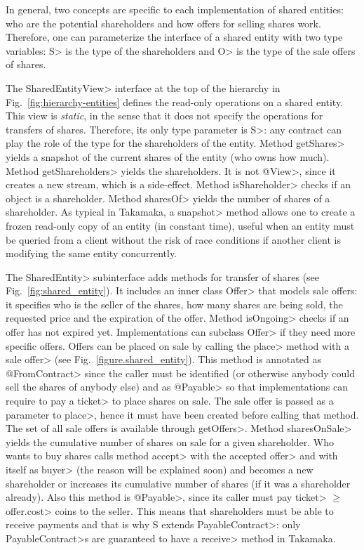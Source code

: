 In general, two concepts are specific to each implementation of shared entities:
who are the potential shareholders and how offers for selling shares work.
Therefore, one can parameterize the interface of a shared entity with two type variables:
\<S> is the type of the shareholders and \<O> is the type of the sale offers of shares.

The \<SharedEntityView> interface at the top of the hierarchy in Fig.~\ref{fig:hierarchy-entities}
defines the read-only operations on a shared entity. This view is \emph{static}, in the sense that it
does not specify the operations for transfers of shares. Therefore, its only type parameter is \<S>:
any contract can play the role of the type for the shareholders of the entity.
Method \<getShares> yields a snapshot of the
current shares of the entity (who owns how much). Method \<getShareholders> yields the shareholders.
It is not \<@View>, since it creates a new stream, which is a side-effect.
Method \<isShareholder> checks if an object is a shareholder. Method \<sharesOf> yields
the number of shares of a shareholder. As typical in Takamaka, a \<snapshot> method allows one
to create a frozen read-only copy of an entity (in constant time), useful when an entity must be queried from
a client without the risk of race conditions if another client is modifying the same entity concurrently.

The \<SharedEntity> subinterface adds methods for transfer of shares
(see Fig.~\ref{fig:shared_entity}).
It includes an inner class \<Offer> that models sale offers:
it specifies who is the seller of the shares,
how many shares are being sold, the requested price and the expiration of the offer.
Method \<isOngoing> checks if an offer has not expired yet.
Implementations can subclass \<Offer> if they need more specific offers.
Offers can be placed on sale
by calling the \<place> method with a sale \<offer>
(see Fig.~\ref{figure.shared_entity}).
This method is annotated as \<@FromContract> since the caller must be
identified (or otherwise anybody could sell the shares of anybody else) and
as \<@Payable> so that implementations can require
to pay a \<ticket> to place shares on sale.
The sale offer is passed as a parameter to \<place>, hence it must have been created before calling that method.
The set of all sale offers is available through \<getOffers>. Method \<sharesOnSale> yields the
cumulative number of shares on sale for a given shareholder.
Who wants to buy shares calls method \<accept> with the accepted \<offer>
and with itself as \<buyer> (the reason will be explained soon)
and becomes a new shareholder or increases
its cumulative number of shares (if it was a shareholder already).
Also this method is \<@Payable>, since its caller must pay \<ticket> $\ge$ \<offer.cost>
coins to the seller.
This means that shareholders must be able to receive payments and that
is why \<S extends PayableContract>: only \<PayableContract>s are guaranteed to have a
\<receive> method in Takamaka.

